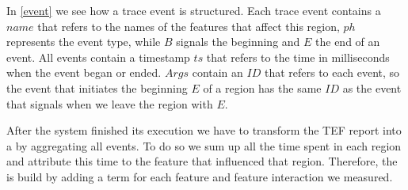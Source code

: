 In \autoref{event} we see how a trace event is structured. Each trace event contains a $name$ that refers to the names of the features that affect this
region, $ph$ represents the event type, while $B$ signals the beginning and $E$ the end of an event.
All events contain a timestamp $ts$ that refers to the time in milliseconds when the event began or ended.
$Args$ contain an $ID$ that refers to each event, so the event that initiates the beginning $E$ of a region has the same $ID$ as the event that signals when
we leave the region with $E$.

After the system finished its execution we have to transform the TEF report into a \perfInfluenceModel by aggregating all events. To do so we sum up 
all the time spent in each region and attribute this time to the feature that influenced that region. %
Therefore, the \perfInfluenceModel is build by adding a term for each feature and feature interaction we measured.  
